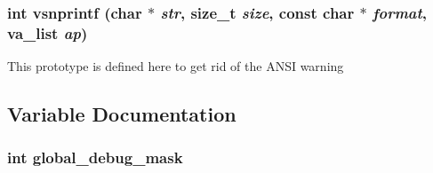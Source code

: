\subsubsection{\setlength{\rightskip}{0pt plus 5cm}int vsnprintf (char $\ast$ {\em str}, size\_\-t {\em size}, const char $\ast$ {\em format}, va\_\-list {\em ap})}\label{custom__debug_8c_2cadafbeb2d6e0d5781f6e5106d41fc2}


This prototype is defined here to get rid of the ANSI warning 

\subsection{Variable Documentation}
\subsubsection{\setlength{\rightskip}{0pt plus 5cm}int \bf{global\_\-debug\_\-mask}}\label{custom__debug_8c_9829777e06287f4b4630251e5844b084}


